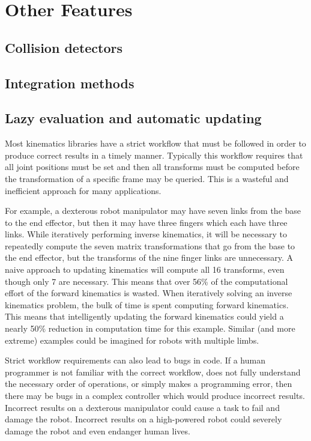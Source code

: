 \section{Other Features}
\subsection{Collision detectors}
\subsection{Integration methods}
\subsection{Lazy evaluation and automatic updating}
\label{sec:lazy}
Most kinematics libraries have a strict workflow that must be followed in order to produce correct results in a timely manner. Typically this workflow requires that all joint positions must be set and then all transforms must be computed before the transformation of a specific frame may be queried. This is a wasteful and inefficient approach for many applications.

For example, a dexterous robot manipulator may have seven links from the base to the end effector, but then it may have three fingers which each have three links. While iteratively performing inverse kinematics, it will be necessary to repeatedly compute the seven matrix transformations that go from the base to the end effector, but the transforms of the nine finger links are unnecessary. A naive approach to updating kinematics will compute all 16 transforms, even though only 7 are necessary. This means that over 56\% of the computational effort of the forward kinematics is wasted. When iteratively solving an inverse kinematics problem, the bulk of time is spent computing forward kinematics. This means that intelligently updating the forward kinematics could yield a nearly 50\% reduction in computation time for this example. Similar (and more extreme) examples could be imagined for robots with multiple limbs.

Strict workflow requirements can also lead to bugs in code. If a human programmer is not familiar with the correct workflow, does not fully understand the necessary order of operations, or simply makes a programming error, then there may be bugs in a complex controller which would produce incorrect results. Incorrect results on a dexterous manipulator could cause a task to fail and damage the robot. Incorrect results on a high-powered robot could severely damage the robot and even endanger human lives.

